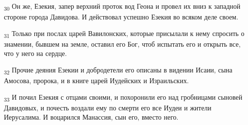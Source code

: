 \begin{tcolorbox}
\textsubscript{30} Он же, Езекия, запер верхний проток вод Геона и провел их вниз к западной стороне города Давидова. И действовал успешно Езекия во всяком деле своем.
\end{tcolorbox}
\begin{tcolorbox}
\textsubscript{31} Только при послах царей Вавилонских, которые присылали к нему спросить о знамении, бывшем на земле, оставил его Бог, чтоб испытать его и открыть все, что у него на сердце.
\end{tcolorbox}
\begin{tcolorbox}
\textsubscript{32} Прочие деяния Езекии и добродетели его описаны в видении Исаии, сына Амосова, пророка, и в книге царей Иудейских и Израильских.
\end{tcolorbox}
\begin{tcolorbox}
\textsubscript{33} И почил Езекия с отцами своими, и похоронили его над гробницами сыновей Давидовых, и почесть воздали ему по смерти его все Иудеи и жители Иерусалима. И воцарился Манассия, сын его, вместо него.
\end{tcolorbox}

